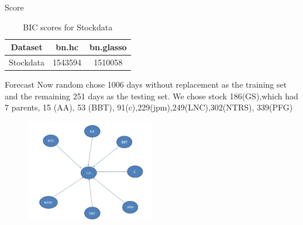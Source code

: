 \documentclass{beamer}
\begin{document}
\begin{frame}

\begin{block}{Score}
\begin{table}[h!]\small
  \caption{BIC scores for Stockdata}
\begin{center}
    \begin{tabular}{| c | c| c | }
    \hline
    Dataset& bn.hc &  bn.glasso\\
    \hline
Stockdata &1543594&1510058\\
\hline
\end{tabular}
  \end{center}
\end{table}

\end{block}
\begin{block}{Forecast}
\small{Now random chose 1006 days without replacement as the training set and the remaining 251 days as the testing set.
We chose stock 186(GS),which had 7 parents, 15 (AA), 53 (BBT), 91(c),229(jpm),249(LNC),302(NTRS), 339(PFG)}\\
\begin{figure}
     \includegraphics[width=0.5\textwidth, height=0.4\textheight]{gs.jpg}
    \end{figure}

\end{block}


\end{frame}
\end{document}
